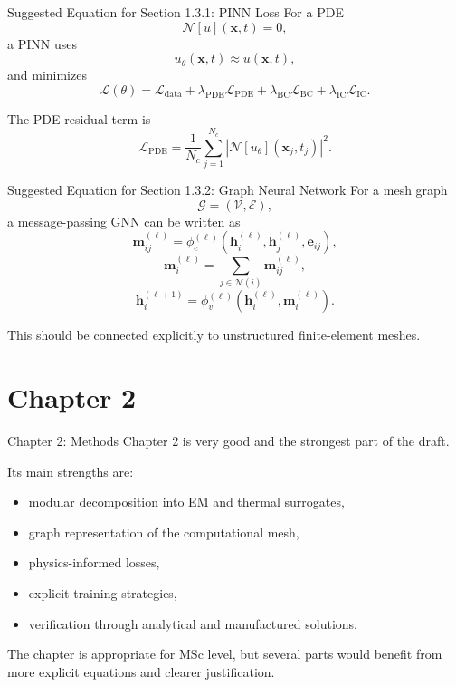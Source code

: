 \documentclass[aspectratio=169]{beamer}
\begin{document}
\begin{frame}{Suggested Equation for Section 1.3.1: PINN Loss}
For a PDE
\[
\mathcal{N}[u](\mathbf{x},t)=0,
\]
a PINN uses
\[
u_\theta(\mathbf{x},t)\approx u(\mathbf{x},t),
\]
and minimizes
\[
\mathcal{L}(\theta)
=
\mathcal{L}_{\mathrm{data}}
+
\lambda_{\mathrm{PDE}}\mathcal{L}_{\mathrm{PDE}}
+
\lambda_{\mathrm{BC}}\mathcal{L}_{\mathrm{BC}}
+
\lambda_{\mathrm{IC}}\mathcal{L}_{\mathrm{IC}}.
\]

The PDE residual term is
\[
\mathcal{L}_{\mathrm{PDE}}
=
\frac{1}{N_c}\sum_{j=1}^{N_c}
\left|
\mathcal{N}[u_\theta](\mathbf{x}_j,t_j)
\right|^2.
\]
\end{frame}

\begin{frame}{Suggested Equation for Section 1.3.2: Graph Neural Network}
For a mesh graph
\[
\mathcal{G}=(\mathcal{V},\mathcal{E}),
\]
a message-passing GNN can be written as
\[
\mathbf{m}_{ij}^{(\ell)}
=
\phi_e^{(\ell)}
\left(
\mathbf{h}_i^{(\ell)},
\mathbf{h}_j^{(\ell)},
\mathbf{e}_{ij}
\right),
\]
\[
\mathbf{m}_i^{(\ell)}
=
\sum_{j\in \mathcal{N}(i)}
\mathbf{m}_{ij}^{(\ell)},
\]
\[
\mathbf{h}_i^{(\ell+1)}
=
\phi_v^{(\ell)}
\left(
\mathbf{h}_i^{(\ell)},\mathbf{m}_i^{(\ell)}
\right).
\]

This should be connected explicitly to unstructured finite-element meshes.
\end{frame}

\section{Chapter 2}

\begin{frame}{Chapter 2: Methods}
Chapter 2 is very good and the strongest part of the draft.

\medskip

Its main strengths are:
\begin{itemize}
    \item modular decomposition into EM and thermal surrogates,
    \item graph representation of the computational mesh,
    \item physics-informed losses,
    \item explicit training strategies,
    \item verification through analytical and manufactured solutions.
\end{itemize}

\medskip

The chapter is appropriate for MSc level, but several parts would benefit from more explicit equations and clearer justification.
\end{frame}
\end{document}
